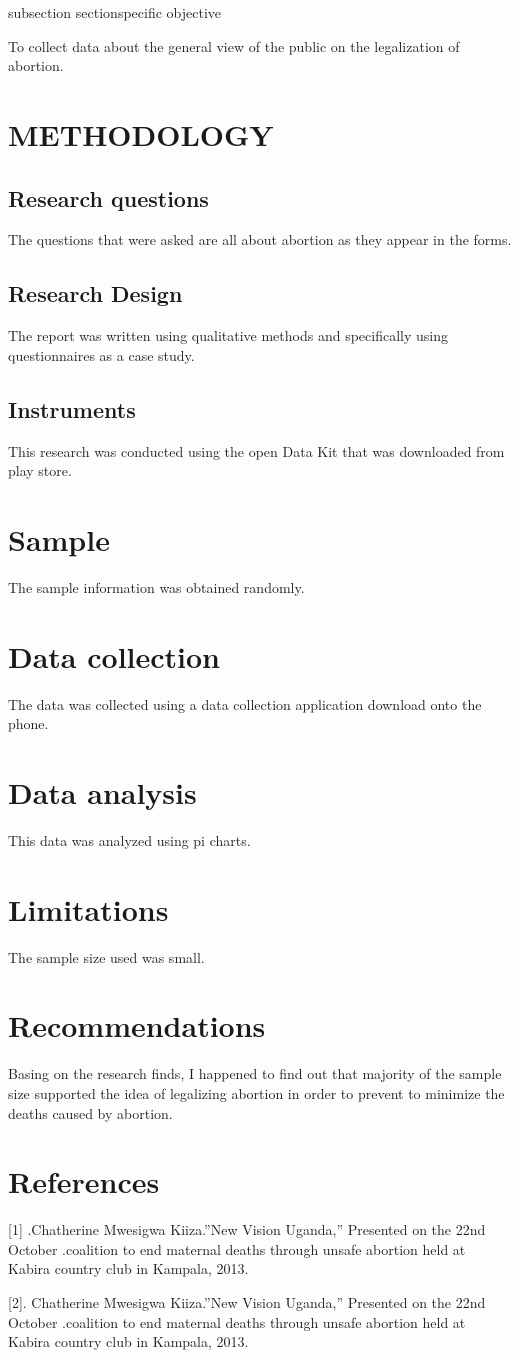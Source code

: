 \documentclass[10]{article}
\begin{document}
subsection section{specific objective}

To collect data about the general view of the public on the legalization of abortion.


\section{METHODOLOGY}
\subsection{Research questions} 
The questions that were asked are all about abortion as they appear in the forms.
\subsection{Research Design}
The report was written using qualitative methods and specifically using questionnaires as a case study. 
\subsection{Instruments}
This research was conducted using the open Data Kit that was downloaded from play store.

\section{Sample}
The sample information was obtained randomly.
\section{Data collection}
The data was collected using a data collection application download onto the phone.

\section{Data analysis}
This data was analyzed using pi charts.
\section{Limitations}
The sample size used was small.

\section{Recommendations}
Basing on the research finds, I happened to find out that majority of the sample size supported the idea of legalizing abortion in order to prevent to minimize the deaths caused by abortion.
\section{References}

[1] .Chatherine Mwesigwa Kiiza.”New Vision Uganda,” Presented on the 22nd October .coalition to end maternal deaths through unsafe abortion held at Kabira country club in Kampala, 2013.

[2]. Chatherine Mwesigwa Kiiza.”New Vision Uganda,” Presented on the 22nd October .coalition to end maternal deaths through unsafe abortion held at Kabira country club in Kampala, 2013.
\end{document}
